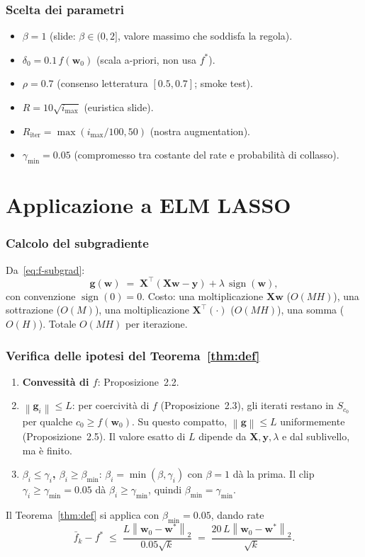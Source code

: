 \documentclass[11pt,a4paper]{article}
\newcommand{\norm}[1]{\left\|#1\right\|}
\newcommand{\bw}{\mathbf{w}}
\newcommand{\bg}{\mathbf{g}}
\newcommand{\by}{\mathbf{y}}
\newcommand{\bX}{\mathbf{X}}
\theoremstyle{definition}
\begin{document}
\section{Scelta dei parametri}

\begin{itemize}[leftmargin=*]
\item $\beta=1$ (slide: $\beta\in(0,2]$, valore massimo che soddisfa la regola).
\item $\delta_0 = 0.1\,f(\bw_0)$ (scala a-priori, non usa $f^*$).
\item $\rho=0.7$ (consenso letteratura $[0.5,0.7]$; smoke test).
\item $R=10\sqrt{i_{\max}}$ (euristica slide).
\item $R_{\mathrm{iter}}=\max(i_{\max}/100, 50)$ (nostra augmentation).
\item $\gamma_{\min}=0.05$ (compromesso tra costante del rate e probabilità di collasso).
\end{itemize}

\part{Applicazione a ELM LASSO}

\section{Calcolo del subgradiente}
\label{sec:elm-app}

Da~\eqref{eq:f-subgrad}:
\[
\bg(\bw) \;=\; \bX^\top(\bX\bw - \by) + \lambda\,\operatorname{sign}(\bw),
\]
con convenzione $\operatorname{sign}(0)=0$. Costo: una moltiplicazione $\bX\bw$ ($O(MH)$), una sottrazione ($O(M)$), una moltiplicazione $\bX^\top(\cdot)$ ($O(MH)$), una somma ($O(H)$). Totale $O(MH)$ per iterazione.

\section{Verifica delle ipotesi del Teorema~\ref{thm:def}}

\begin{enumerate}[leftmargin=*]
\item \textbf{Convessità di $f$}: Proposizione~2.2.
\item \textbf{$\norm{\bg_i}\le L$}: per coercività di $f$ (Proposizione~2.3), gli iterati restano in $S_{c_0}$ per qualche $c_0\ge f(\bw_0)$. Su questo compatto, $\norm{\bg}\le L$ uniformemente (Proposizione~2.5). Il valore esatto di $L$ dipende da $\bX,\by,\lambda$ e dal sublivello, ma è finito.
\item \textbf{$\beta_i\le\gamma_i$, $\beta_i\ge\beta_{\min}$}: $\beta_i=\min(\beta,\gamma_i)$ con $\beta=1$ dà la prima. Il clip $\gamma_i\ge\gamma_{\min}=0.05$ dà $\beta_i\ge\gamma_{\min}$, quindi $\beta_{\min}=\gamma_{\min}$.
\end{enumerate}
Il Teorema~\ref{thm:def} si applica con $\beta_{\min}=0.05$, dando rate
\[
\bar f_k - f^* \;\le\; \frac{L\norm{\bw_0-\bw^*}_2}{0.05\sqrt{k}} \;=\; \frac{20\,L\norm{\bw_0-\bw^*}_2}{\sqrt{k}}.
\]
\end{document}
